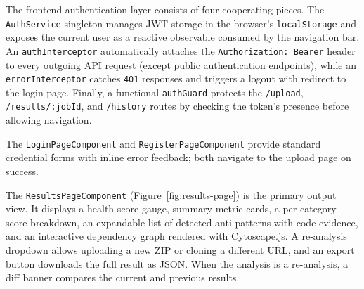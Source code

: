 \par The frontend authentication layer consists of four cooperating pieces. The \texttt{AuthService} singleton manages JWT storage in the browser's \texttt{localStorage} and exposes the current user as a reactive observable consumed by the navigation bar. An \texttt{authInterceptor} automatically attaches the \texttt{Authorization: Bearer} header to every outgoing API request (except public authentication endpoints), while an \texttt{errorInterceptor} catches \texttt{401} responses and triggers a logout with redirect to the login page. Finally, a functional \texttt{authGuard} protects the \texttt{/upload}, \texttt{/results/:jobId}, and \texttt{/history} routes by checking the token's presence before allowing navigation.


The \texttt{LoginPageComponent} and \texttt{RegisterPageComponent} provide standard credential forms with inline error feedback; both navigate to the upload page on success.


The \texttt{ResultsPageComponent} (Figure~\ref{fig:results-page}) is the primary output view. It displays a health score gauge, summary metric cards, a per-category score breakdown, an expandable list of detected anti-patterns with code evidence, and an interactive dependency graph rendered with Cytoscape.js. A re-analysis dropdown allows uploading a new ZIP or cloning a different URL, and an export button downloads the full result as JSON. When the analysis is a re-analysis, a diff banner compares the current and previous results.


